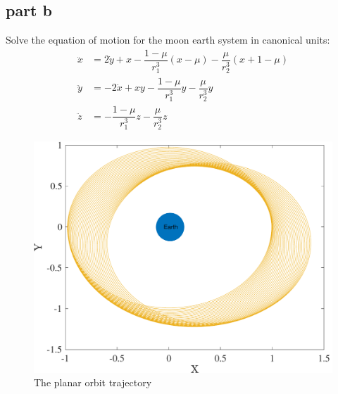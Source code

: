 \subsection{part b}
Solve the equation of motion for the moon earth system in canonical units:
\begin{equation*}
    \begin{split}
        \ddot{x} &= 2\dot{y} + x - \dfrac{1-\mu}{r_1^3}(x-\mu) -\dfrac{\mu}{r_2^3}(x +1-\mu)\\ %
        \ddot{y} &= -2\dot x + xy - \dfrac{1-\mu}{r_1^3}y -\dfrac{\mu}{r_2^3}y\\ %
        \ddot{z} &= - \dfrac{1-\mu}{r_1^3}z -\dfrac{\mu}{r_2^3}z %
    \end{split}
\end{equation*}

\begin{figure}[H]
    \caption{The planar orbit trajectory}
    \centering
    \includegraphics[width=12cm]{../Figure/Q4/xyplane}
\end{figure}
